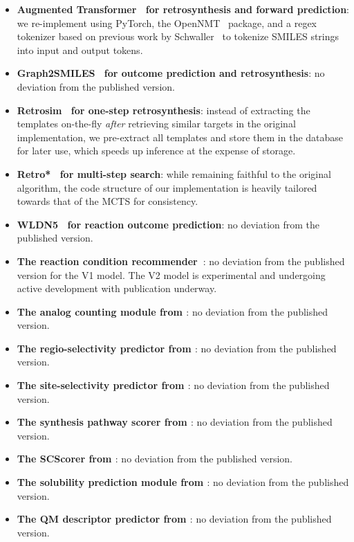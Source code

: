 \documentclass[pdflatex,sn-mathphys-num]{sn-jnl}%
\theoremstyle{thmstyleone}%
\theoremstyle{thmstyletwo}%
\theoremstyle{thmstylethree}%
\begin{document}
\begin{itemize}
    \item \textbf{Augmented Transformer~\citep{tetko_state---art_2020} for retrosynthesis and forward prediction}: we re-implement using PyTorch, the OpenNMT~\citep{klein_opennmt_2017} package, and a regex tokenizer based on previous work by Schwaller~\citep{schwaller_found_2018,schwaller_molecular_2019} to tokenize SMILES strings into input and output tokens.
    \item \textbf{Graph2SMILES~\citep{tu_permutation_2022} for outcome prediction and retrosynthesis}: no deviation from the published version.
    \item \textbf{Retrosim~\citep{coley_computer-assisted_2017} for one-step retrosynthesis}: instead of extracting the templates on-the-fly \emph{after} retrieving similar targets in the original implementation, we pre-extract all templates and store them in the database for later use, which speeds up inference at the expense of storage.
    \item \textbf{Retro*~\citep{chen_retro_2020} for multi-step search}: while remaining faithful to the original algorithm, the code structure of our implementation is heavily tailored towards that of the MCTS for consistency.
    \item \textbf{WLDN5~\citep{coley_graph-convolutional_2019} for reaction outcome prediction}: no deviation from the published version.
    \item \textbf{The reaction condition recommender~\citep{gao_using_2018}}: no deviation from the published version for the V1 model. The V2 model is experimental and undergoing active development with publication underway.
    \item \textbf{The analog counting module from \citet{levin_computer-aided_2023}}: no deviation from the published version.
    \item \textbf{The regio-selectivity predictor from \citet{guan_regio-selectivity_2021}}: no deviation from the published version.
    \item \textbf{The site-selectivity predictor from \citet{struble_multitask_2020}}: no deviation from the published version.
    \item \textbf{The synthesis pathway scorer from \citet{mo_evaluating_2021}}: no deviation from the published version.
    \item \textbf{The SCScorer from \citet{coley_scscore_2018}}: no deviation from the published version.
    \item \textbf{The solubility prediction module from \citet{vermeire_predicting_2022}}: no deviation from the published version.
    \item \textbf{The QM descriptor predictor from \citet{li_when_2024}}: no deviation from the published version.
\end{itemize}
\end{document}
